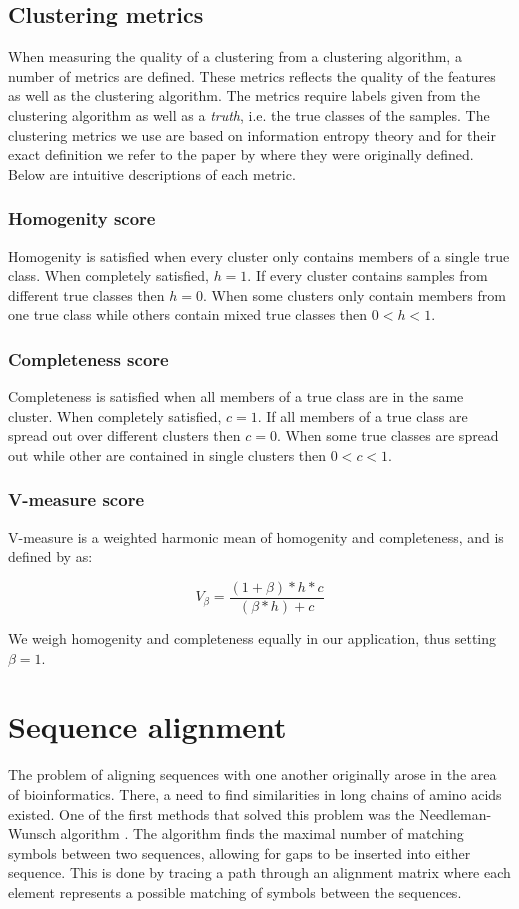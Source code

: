 \documentclass[a4paper]{report}
\begin{document}
\subsection{Clustering metrics}
\label{sec:metrics}
When measuring the quality of a clustering from a clustering algorithm, a
number of metrics are defined. These metrics reflects the quality of the
features as well as the clustering algorithm. The metrics require labels
given from the clustering algorithm as well as a \emph{truth}, i.e. the true
classes of the samples. The clustering metrics we use are based on information
entropy theory and for their exact definition we refer to the paper by
\citet{rosenberg07} where they were originally defined. Below are intuitive
descriptions of each metric.

\subsubsection{Homogenity score}
Homogenity is satisfied when every cluster only contains members of a single
true class. When completely satisfied, $h = 1$. If every cluster contains
samples from different true classes then $h = 0$. When some clusters only
contain members from one true class while others contain mixed true classes
then $0 < h < 1$.

\subsubsection{Completeness score}
Completeness is satisfied when all members of a true class are in the same
cluster. When completely satisfied, $c = 1$. If all members of a true class
are spread out over different clusters then $c = 0$. When some true classes
are spread out while other are contained in single clusters then
$0 < c < 1$.

\subsubsection{V-measure score}
V-measure is a weighted harmonic mean of homogenity and completeness, and
is defined by \citeauthor{rosenberg07} as:

\[
    V_{\beta} = \frac{(1 + \beta) * h * c}{(\beta * h) + c}
\]

We weigh homogenity and completeness equally in our application, thus setting
$\beta = 1$.

\section{Sequence alignment}
The problem of aligning sequences with one another originally arose in the area
of bioinformatics. There, a need to find similarities in long chains of amino
acids existed. One of the first methods that solved this problem was the
Needleman-Wunsch algorithm \citep{needleman70}. The algorithm finds the maximal
number of matching symbols between two sequences, allowing for gaps to be
inserted into either sequence. This is done by tracing a path through an
alignment matrix where each element represents a possible matching of symbols
between the sequences.
\end{document}
